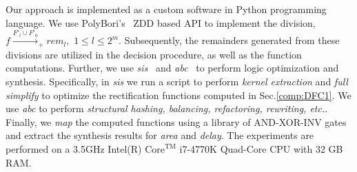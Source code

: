 Our approach is implemented as a custom software in Python programming language. 
We use PolyBori's~\cite{pbori:JSC09} ZDD based API to implement the division, 
$f\xrightarrow{F'_l\cup F'_{0}}_+ rem_l,$ $ 1 \leq l \leq 2^m$. Subsequently, 
the remainders generated from these divisions are utilized in the decision procedure, 
as well as the function computations.
Further, we use {\it sis}~\cite{SIS92} and {\it abc}~\cite{abc} to perform 
logic optimization and synthesis. Specifically, in {\it sis} we run a 
script to perform {\it kernel extraction} and {\it full simplify} to optimize the 
rectification functions computed in Sec.\ref{comp:DFC1}. We use {\it abc}
to perform {\it structural hashing, balancing, refactoring, rewriting, etc.}.
Finally, we {\it map} the computed functions using a library of AND-XOR-INV gates and extract
the synthesis results for {\it area} and {\it delay}. The experiments are performed on a 3.5GHz 
Intel(R) $\text{Core}^{\text{TM}}$ i7-4770K Quad-Core CPU with 32 GB RAM.

